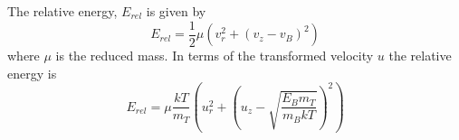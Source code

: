 The relative energy, $E_{rel}$ is given by 
\begin{equation}
E_{rel} = \frac{1}{2}\mu\left ( v_r^2 + (v_z - v_B)^2 \right )
\end{equation}
where $\mu$ is the reduced mass. In terms of the transformed velocity $u$ the relative energy is 
\begin{equation}
E_{rel} = \mu \frac{kT}{m_T} \left ( u_r^2 + \left(u_z - \sqrt{\frac{E_B m_T}{m_B kT}}\right)^2 \right )
\end{equation}